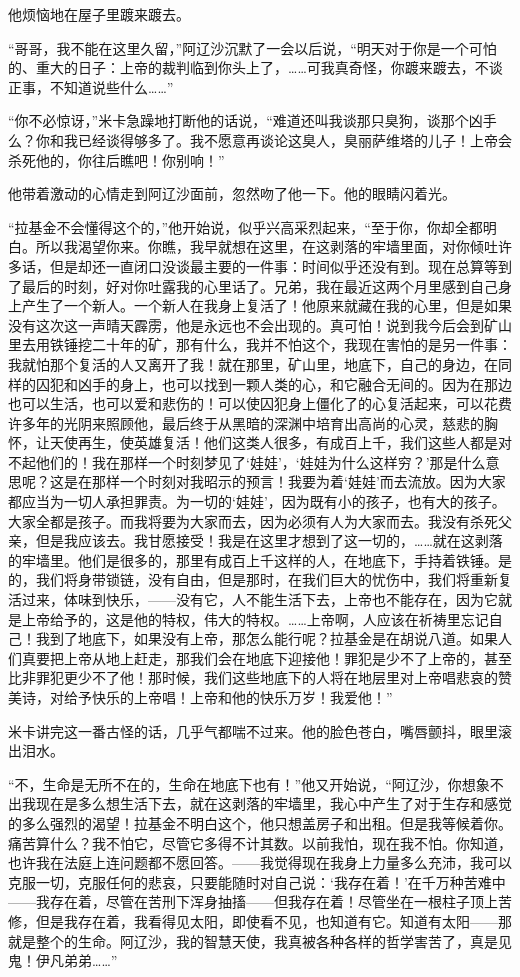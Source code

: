 \par 他烦恼地在屋子里踱来踱去。
\par “哥哥，我不能在这里久留，”阿辽沙沉默了一会以后说，“明天对于你是一个可怕的、重大的日子：上帝的裁判临到你头上了，……可我真奇怪，你踱来踱去，不谈正事，不知道说些什么……”
\par “你不必惊讶，”米卡急躁地打断他的话说，“难道还叫我谈那只臭狗，谈那个凶手么？你和我已经谈得够多了。我不愿意再谈论这臭人，臭丽萨维塔的儿子！上帝会杀死他的，你往后瞧吧！你别响！”
\par 他带着激动的心情走到阿辽沙面前，忽然吻了他一下。他的眼睛闪着光。
\par “拉基金不会懂得这个的，”他开始说，似乎兴高采烈起来，“至于你，你却全都明白。所以我渴望你来。你瞧，我早就想在这里，在这剥落的牢墙里面，对你倾吐许多话，但是却还一直闭口没谈最主要的一件事：时间似乎还没有到。现在总算等到了最后的时刻，好对你吐露我的心里话了。兄弟，我在最近这两个月里感到自己身上产生了一个新人。一个新人在我身上复活了！他原来就藏在我的心里，但是如果没有这次这一声晴天霹雳，他是永远也不会出现的。真可怕！说到我今后会到矿山里去用铁锤挖二十年的矿，那有什么，我并不怕这个，我现在害怕的是另一件事：我就怕那个复活的人又离开了我！就在那里，矿山里，地底下，自己的身边，在同样的囚犯和凶手的身上，也可以找到一颗人类的心，和它融合无间的。因为在那边也可以生活，也可以爱和悲伤的！可以使囚犯身上僵化了的心复活起来，可以花费许多年的光阴来照顾他，最后终于从黑暗的深渊中培育出高尚的心灵，慈悲的胸怀，让天使再生，使英雄复活！他们这类人很多，有成百上千，我们这些人都是对不起他们的！我在那样一个时刻梦见了‘娃娃’，‘娃娃为什么这样穷？’那是什么意思呢？这是在那样一个时刻对我昭示的预言！我要为着‘娃娃’而去流放。因为大家都应当为一切人承担罪责。为一切的‘娃娃’，因为既有小的孩子，也有大的孩子。大家全都是孩子。而我将要为大家而去，因为必须有人为大家而去。我没有杀死父亲，但是我应该去。我甘愿接受！我是在这里才想到了这一切的，……就在这剥落的牢墙里。他们是很多的，那里有成百上千这样的人，在地底下，手持着铁锤。是的，我们将身带锁链，没有自由，但是那时，在我们巨大的忧伤中，我们将重新复活过来，体味到快乐，——没有它，人不能生活下去，上帝也不能存在，因为它就是上帝给予的，这是他的特权，伟大的特权。……上帝啊，人应该在祈祷里忘记自己！我到了地底下，如果没有上帝，那怎么能行呢？拉基金是在胡说八道。如果人们真要把上帝从地上赶走，那我们会在地底下迎接他！罪犯是少不了上帝的，甚至比非罪犯更少不了他！那时候，我们这些地底下的人将在地层里对上帝唱悲哀的赞美诗，对给予快乐的上帝唱！上帝和他的快乐万岁！我爱他！”
\par 米卡讲完这一番古怪的话，几乎气都喘不过来。他的脸色苍白，嘴唇颤抖，眼里滚出泪水。
\par “不，生命是无所不在的，生命在地底下也有！”他又开始说，“阿辽沙，你想象不出我现在是多么想生活下去，就在这剥落的牢墙里，我心中产生了对于生存和感觉的多么强烈的渴望！拉基金不明白这个，他只想盖房子和出租。但是我等候着你。痛苦算什么？我不怕它，尽管它多得不计其数。以前我怕，现在我不怕。你知道，也许我在法庭上连问题都不愿回答。——我觉得现在我身上力量多么充沛，我可以克服一切，克服任何的悲哀，只要能随时对自己说：‘我存在着！’在千万种苦难中——我存在着，尽管在苦刑下浑身抽搐——但我存在着！尽管坐在一根柱子顶上苦修，但是我存在着，我看得见太阳，即使看不见，也知道有它。知道有太阳——那就是整个的生命。阿辽沙，我的智慧天使，我真被各种各样的哲学害苦了，真是见鬼！伊凡弟弟……”
